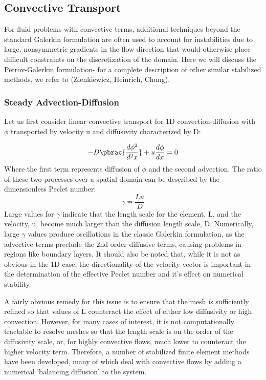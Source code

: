 \subsection{Convective Transport}

For fluid problems with convective terms, additional techniques beyond the standard Galerkin formulation are often used to account for instabilities due to large, nonsymmetric gradients in the flow direction that would otherwise place difficult constraints on the discretization of the domain. Here we will discuss the Petrov-Galerkin formulation- for a complete description of other similar stabilized methods, we refer to (Zienkiewicz, Heinrich, Chung). 

\subsubsection{Steady Advection-Diffusion}

Let us first consider linear convective transport for 1D convection-diffusion with $\phi$ transported by velocity u and diffusivity characterized by D:

\begin{equation}
  -D\pbrac{\frac{d\phi^2}{d^2x}}+u\frac{d\phi}{dx}=0
  \label{eqn:AdvectionDiffusion}
\end{equation}
Where the first term represents diffusion of $\phi$ and the second advection. The ratio of these two processes over a spatial domain can be described by the dimensionless Peclet number:
\begin{equation}
 \gamma=\frac{Lu}{D}
\end{equation}
Large values for $\gamma$ indicate that the length scale for the element, L, and the velocity, u, become much larger than the diffusion length scale, D. Numerically, large $\gamma$ values produce oscillations in the classic Galerkin formulation, as the advective terms preclude the 2nd order diffusive terms, causing problems in regions like boundary layers. It should also be noted that, while it is not as obvious in the 1D case, the directionality of the velocity vector is important in the determination of the effective Peclet number and it's effect on numerical stability.

A fairly obvious remedy for this issue is to ensure that the mesh is sufficiently refined so that values of L counteract the effect of either low diffusivity or high convection. However, for many cases of interest, it is not computationally tractable to resolve meshes so that the length scale is on the order of the diffusivity scale, or, for highly convective flows, much lower to counteract the higher velocity term. Therefore, a number of stabilized finite element methods have been developed, many of which deal with convective flows by adding a numerical 'balancing diffusion' to the system.

